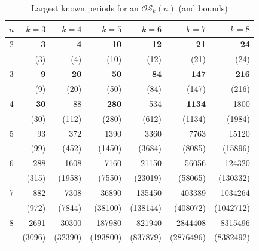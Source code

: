 \documentclass[a4paper,11pt]{article}
\begin{document}
\begin{table}[htb]
\centering
\caption{Largest known periods for an $\mathcal{OS}_k(n)$ (and bounds)}
\label{table:OS_periods_bounds}

\begin{tabular}{crrrrrr} \hline
$n$ & $k=3$   & $k=4$    & $k=5$    & $k=6$    & $k=7$     & $k=8$     \\ \hline
2   & {\bf 3} & {\bf 4}  & {\bf 10} & {\bf 12} & {\bf 21}  & {\bf 24}  \\
    & (3)     & (4)      & (10)     & (12)     & (21)      & (24)      \\ \hline
3   & {\bf 9} & {\bf 20} & {\bf 50} & {\bf 84} & {\bf 147} & {\bf  216}\\
    & (9)     & (20)     & (50)     & (84)     & (147)     & (216)     \\ \hline
4   & {\bf 30}& 88       & {\bf 280}& 534      & {\bf 1134}&  1800     \\
    & (30)    & (112)    & (280)    & (612)    & (1134)    & (1984)    \\ \hline
5   & 93      & 372      & 1390     & 3360     & 7763      &  15120    \\
    & (99)    & (452)    & (1450)   & (3684)   & (8085)    & (15896)   \\ \hline
6   & 288     & 1608     & 7160     & 21150    & 56056     &  124320   \\
    & (315)   & (1958)   & (7550)   & (23019)  & (58065)   & (130332)  \\ \hline
7   & 882     & 7308     & 36890    & 135450   & 403389    &  1034264  \\
    & (972)   & (7844)   & (38100)  & (138144) & (408072)  & (1042712) \\ \hline
8   & 2691    & 30300    & 187980   & 821940   & 2844408   &  8315496  \\
    & (3096)  & (32390)  & (193800) & (837879) & (2876496) & (8382492) \\ \hline
\end{tabular}
\end{table}
\end{document}
